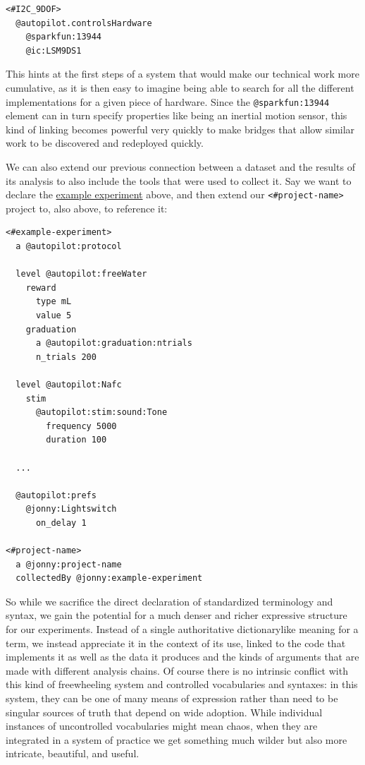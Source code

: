 \documentclass[notoc]{tufte-book}
\begin{document}
\begin{verbatim}
<#I2C_9DOF>
  @autopilot.controlsHardware
    @sparkfun:13944
    @ic:LSM9DS1
\end{verbatim}

This hints at the first steps of a system that would make our technical
work more cumulative, as it is then easy to imagine being able to search
for all the different implementations for a given piece of hardware.
Since the \texttt{@sparkfun:13944} element can in turn specify
properties like being an inertial motion sensor, this kind of linking
becomes powerful very quickly to make bridges that allow similar work to
be discovered and redeployed quickly.

We can also extend our previous connection between a dataset and the
results of its analysis to also include the tools that were used to
collect it. Say we want to declare the
\href{https://gist.github.com/sneakers-the-rat/eebe675326a157df49f66f62c4e33a6e}{example
experiment} above, and then extend our
\texttt{\textless{}\#project-name\textgreater{}} project to, also above,
to reference it:

\begin{verbatim}
<#example-experiment>
  a @autopilot:protocol

  level @autopilot:freeWater
    reward
      type mL
      value 5
    graduation 
      a @autopilot:graduation:ntrials
      n_trials 200

  level @autopilot:Nafc
    stim
      @autopilot:stim:sound:Tone
        frequency 5000
        duration 100

  ...

  @autopilot:prefs
    @jonny:Lightswitch
      on_delay 1

<#project-name>
  a @jonny:project-name
  collectedBy @jonny:example-experiment
\end{verbatim}

So while we sacrifice the direct declaration of standardized terminology
and syntax, we gain the potential for a much denser and richer
expressive structure for our experiments. Instead of a single
authoritative dictionarylike meaning for a term, we instead appreciate
it in the context of its use, linked to the code that implements it as
well as the data it produces and the kinds of arguments that are made
with different analysis chains. Of course there is no intrinsic conflict
with this kind of freewheeling system and controlled vocabularies and
syntaxes: in this system, they can be one of many means of expression
rather than need to be singular sources of truth that depend on wide
adoption. While individual instances of uncontrolled vocabularies might
mean chaos, when they are integrated in a system of practice we get
something much wilder but also more intricate, beautiful, and useful.
\end{document}
